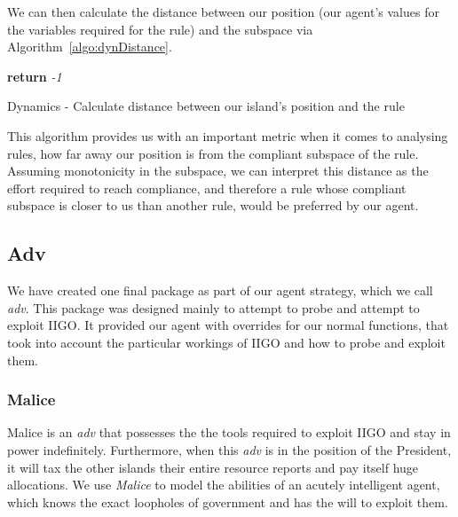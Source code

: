 We can then calculate the distance between our position (our agent's values for the variables required for the rule) and the subspace via Algorithm~\ref{algo:dynDistance}.

\begin{algorithm}[H]
\DontPrintSemicolon %
  {
   \textbf{return} \textit{-1}\;
 }
 
\caption{Dynamics - Calculate distance between our island's position and the rule}
\label{algo:dynDistance}
\end{algorithm}

This algorithm provides us with an important metric when it comes to analysing rules, how far away our position is from the compliant subspace of the rule. Assuming monotonicity in the subspace, we can interpret this distance as the effort required to reach compliance, and therefore a rule whose compliant subspace is closer to us than another rule, would be preferred by our agent. \\

\subsection{Adv}
We have created one final package as part of our agent strategy, which we call \emph{adv}. This package was designed mainly to attempt to probe and attempt to exploit IIGO. It provided our agent with overrides for our normal functions, that took into account the particular workings of IIGO and how to probe and exploit them.\\

\subsubsection{Malice}
Malice is an \emph{adv} that possesses the the tools required to exploit IIGO and stay in power indefinitely. Furthermore, when this \emph{adv} is in the position of the President, it will tax the other islands their entire resource reports and pay itself huge allocations. We use \emph{Malice} to model the abilities of an acutely intelligent agent, which knows the exact loopholes of government and has the will to exploit them.

